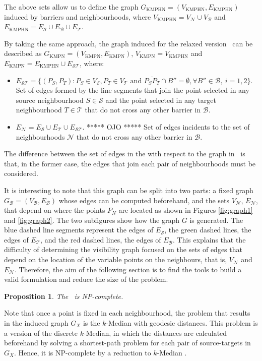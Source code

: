 \documentclass[a4paper,  review, authoryear, 1p.]{elsarticle}
\newcommand{\KMPHN}{{\sf{H-KMPHN}}}
\newcommand{\KMPN}{{\sf{H-KMPN}\xspace }}
\newcommand{\B}{{\mathcal B}}
\newcommand{\VB}{{V^{}_{\mathcal B}}}
\newcommand{\EB}{{E^{}_{\mathcal B}}}
\newcommand{\VS}{{V^{}_{\mathcal S}}}
\newcommand{\ES}{{E^{}_{\mathcal S}}}
\newcommand{\VT}{{V^{}_{\mathcal T}}}
\newcommand{\ET}{{E^{}_{\mathcal T}}}
\newcommand{\VN}{{V^{}_{\mathcal N}}}
\newcommand{\EN}{{E^{}_{\mathcal N}}}
\newcommand{\EST}{{E^{}_{\mathcal S\mathcal T}}}
\newcommand{\GKMPHN}{{G_{\text{KMPHN}}}}
\newcommand{\VKMPHN}{{V_{\text{KMPHN}}}}
\newcommand{\EKMPHN}{{E_{\text{KMPHN}}}}
\newcommand{\GKMPN}{{G_{\text{KMPN}}}}
\newcommand{\VKMPN}{{V_{\text{KMPN}}}}
\newcommand{\EKMPN}{{E_{\text{KMPN}}}}
\newtheorem{prop}{Proposition}
\newcommand{\JP}[1]{{\color{blue}#1}}
\newcommand{\CV}[1]{{\color{blue}#1}}
\begin{document}
	The above sets allow us to define the graph $\GKMPHN= (\VKMPHN, \EKMPHN)$ induced by barriers and neighbourhoods, where $\VKMPHN=\VN\cup\VB$ and $\EKMPHN=\ES\cup\EB\cup\ET$. 
	
	By taking the same approach, the graph induced for the relaxed version \KMPN \ can be described as $\GKMPN= (\VKMPN, \EKMPN)$, $\VKMPN= \VKMPHN$ and $\EKMPN=\EKMPHN\cup \EST$, where:
	\begin{itemize}
		\item $\EST=\{(P_S, P_T):P_S\in\VS, P_T\in\VT \text{ and } \overline{P_SP_T}\cap B''=\emptyset,\forall B''\in\B,\:i=1,2\}$. Set of edges formed by the line segments that join the point selected in any source neighbourhood $S\in \mathcal{S}$ and the point selected in any target neighbourhood $T\in \mathcal{T}$ \CV{that do not cross any other barrier in $\B$.}
    	\item \JP{$\EN=\ES\cup\ET\cup\EST.$ ***** OJO ***** Set of edges incidents to the set of neighbourhoods $\mathcal N$ that do not cross any other barrier in $\B$.}
	\end{itemize}
	

	\CV{The difference between the set of edges in the \KMPHN \xspace with respect to the graph in \KMPN \ is that, in the former case, the edges that join each pair of neighbourhoods must be considered.}
	
	\JP{It is interesting to note that this graph can be split into two parts: a fixed graph $G_\B=(\VB,\EB)$ whose edges can be computed beforehand, and the sets $\VN$, $\EN$, that depend on where the points $P_N$ are located as shown in Figures \ref{fig:graph1} and \ref{fig:graph2}.  The two subfigures show how the graph $G$ is generated. The blue dashed line segments represent the edges of $\ES$, the green dashed lines, the edges of $\ET$, and the red dashed lines, the edges of $\EB$. This explains that the difficulty of determining the visibility graph focused on the sets of edges that depend on the location of the variable points on the neighbours, that is, $\VN$ and $\EN$. Therefore, the aim of the following section is to find the tools to build a valid formulation and reduce the size of the problem.}

	
	
	\CV{
		\begin{prop}
			The \KMPN \ is NP-complete.
		\end{prop}
		
	Note that once a point is fixed in each neighbourhood, the problem that results in the induced graph $G_X$ is the $k$-Median with geodesic distances. This problem is a version of the discrete $k$-Median, in which the distances are calculated beforehand by solving a shortest-path problem for each pair of source-targets in $G_X$. Hence, it is NP-complete by a reduction to $k$-Median \citep{kariv1979}.}
	
\end{document}

